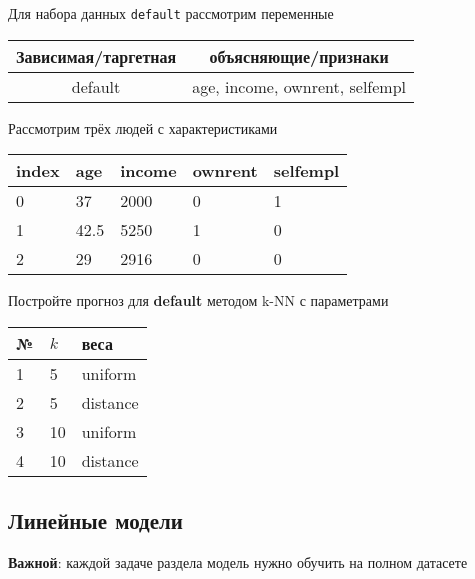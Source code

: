 \begin{exercise}
Для набора данных \texttt{default} рассмотрим переменные
\begin{center}
	\begin{tabular}{|c|c|} \hline
		Зависимая/таргетная & объясняющие/признаки \\ \hline
		default & age, income, ownrent, selfempl \\ \hline
	\end{tabular}
\end{center}
Рассмотрим трёх людей с характеристиками
	\begin{center}
		\begin{tabular}{|l||l|l|l|l|}\hline
			index & age & income & ownrent & selfempl  \\ \hline\hline
			0 & 37 & 2000 & 0 & 1  \\
			1 & 42.5 & 5250 & 1 & 0  \\
			2 & 29 & 2916 & 0 & 0  \\ \hline
		\end{tabular}
	\end{center}
Постройте прогноз для \textbf{default} методом k-NN с параметрами
\begin{center}
	\begin{tabular}{|l|l|l|}\hline
	№ & \(k\) & веса \\ \hline
	1 & 5 & uniform \\
	2 & 5 & distance \\
	3 & 10 & uniform \\
	4 & 10 & distance \\ \hline
	\end{tabular}
\end{center}
\end{exercise}

\subsection{Линейные модели}

\textbf{Важной}: каждой задаче раздела модель нужно обучить на полном датасете

